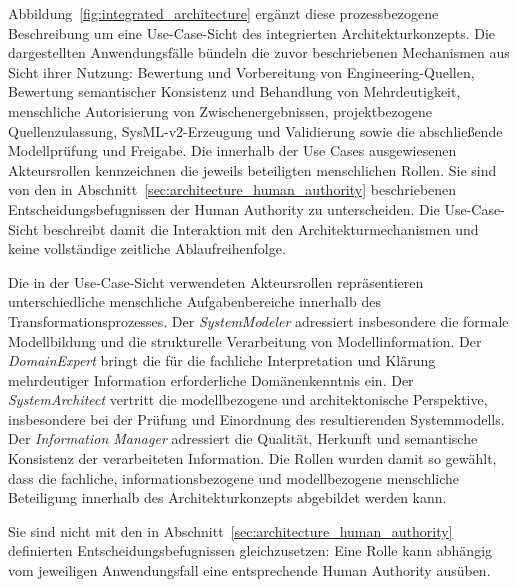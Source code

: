 Abbildung~\ref{fig:integrated_architecture} ergänzt diese prozessbezogene
Beschreibung um eine Use-Case-Sicht des integrierten Architekturkonzepts.
Die dargestellten Anwendungsfälle bündeln die zuvor beschriebenen Mechanismen
aus Sicht ihrer Nutzung: Bewertung und Vorbereitung von Engineering-Quellen,
Bewertung semantischer Konsistenz und Behandlung von Mehrdeutigkeit, menschliche
Autorisierung von Zwischenergebnissen, projektbezogene Quellenzulassung,
SysML-v2-Erzeugung und Validierung sowie die abschließende Modellprüfung und
Freigabe. Die innerhalb der Use Cases ausgewiesenen Akteursrollen
kennzeichnen die jeweils beteiligten menschlichen Rollen. Sie sind von den in
Abschnitt~\ref{sec:architecture_human_authority} beschriebenen
Entscheidungsbefugnissen der Human Authority zu unterscheiden. Die
Use-Case-Sicht beschreibt damit die Interaktion mit den
Architekturmechanismen und keine vollständige zeitliche Ablaufreihenfolge.

Die in der Use-Case-Sicht verwendeten Akteursrollen repräsentieren
unterschiedliche menschliche Aufgabenbereiche innerhalb des
Transformationsprozesses. Der \emph{SystemModeler} adressiert insbesondere
die formale Modellbildung und die strukturelle Verarbeitung von
Modellinformation. Der \emph{DomainExpert} bringt die für die fachliche
Interpretation und Klärung mehrdeutiger Information erforderliche
Domänenkenntnis ein. Der \emph{SystemArchitect} vertritt die
modellbezogene und architektonische Perspektive, insbesondere bei der
Prüfung und Einordnung des resultierenden Systemmodells. Der
\emph{Information Manager} adressiert die Qualität, Herkunft und
semantische Konsistenz der verarbeiteten Information. Die Rollen wurden
damit so gewählt, dass die fachliche, informationsbezogene und
modellbezogene menschliche Beteiligung innerhalb des Architekturkonzepts
abgebildet werden kann. 

\noindent Sie sind nicht mit den in
Abschnitt~\ref{sec:architecture_human_authority} definierten
Entscheidungsbefugnissen gleichzusetzen: Eine Rolle kann abhängig vom
jeweiligen Anwendungsfall eine entsprechende Human Authority ausüben.

